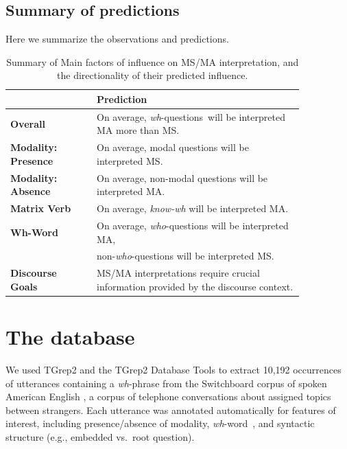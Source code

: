\documentclass[12pt,letterpaper,table,svgnames,dvipsnames]{article}
\newcommand{\jd}[1]{\textcolor{Purple}{[jd: #1]}}
\newcommand{\mm}[1]{\textcolor{teal}{[mm: #1]}}
\newcommand{\whqs}{\emph{wh}-questions~}
\newcommand{\whw}{\emph{wh}-word~}
\begin{document}


\subsection{Summary of predictions}

Here we summarize the observations and predictions.
\begin{table}[h!]
    \centering
   \begin{tabular}{| p{0.25\linewidth} | p{0.6\linewidth} |}
    \hline
    {} & \textbf{Prediction} \\
    \hline
    \textbf{Overall} & On average, \whqs will be interpreted MA more than MS.\\
    \hline
    \textbf{Modality: Presence} & On average, modal questions will be interpreted MS.\\
    \textbf{Modality: Absence} & On average, non-modal questions will be interpreted MA. \\
    \hline
    \textbf{Matrix Verb} & On average, \emph{know-wh} will be interpreted MA.\\
    \hline
    \textbf{Wh-Word} & On average, \emph{who}-questions will be interpreted MA,\\
    {} & non-\emph{who}-questions will be interpreted MS.\\
    \hline
    \textbf{Discourse Goals} & MS/MA interpretations require crucial information provided by the discourse context.\\
    \hline
   \end{tabular}
    \caption{Summary of Main factors of influence on MS/MA interpretation, and the directionality of their predicted influence.}
    \label{fig:my_label}
\end{table}


\newpage
\section{The database}

We used TGrep2 \cite{rohde2005tgrep2} and the TGrep2 Database Tools \cite{degen2011tgrep2} to extract 10,192 occurrences of utterances containing a \emph{wh}-phrase from the Switchboard corpus of spoken American English \cite{godholmcd1992}, a corpus of telephone conversations about assigned topics between strangers. Each utterance was annotated automatically for features of interest, including presence/absence of modality, \whw, and syntactic structure (e.g., embedded vs.~root question). 
\end{document}

